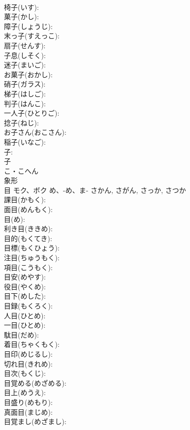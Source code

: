 \documentclass[8pt]{extreport}
\begin{document}
\begin{CJK}{UTF8}{min}
\\	椅子(いす): 
\\	菓子(かし): 
\\	障子(しょうじ): 
\\	末っ子(すえっこ): 
\\	扇子(せんす): 
\\	子息(しそく): 
\\	迷子(まいご): 
\\	お菓子(おかし): 
\\	硝子(ガラス): 
\\	梯子(はしご): 
\\	判子(はんこ): 
\\	一人子(ひとりご): 
\\	捻子(ねじ): 
\\	お子さん(おこさん): 
\\	稲子(いなご): 
\\	子: 
\\	子	
\\	こ・こへん	
\\	象形 
\\	目	モク、ボク	め、-め、ま-	さかん, さがん, さっか, さつか	
\\	課目(かもく): 
\\	面目(めんもく): 
\\	目(め): 
\\	利き目(ききめ): 
\\	目的(もくてき): 
\\	目標(もくひょう): 
\\	注目(ちゅうもく): 
\\	項目(こうもく): 
\\	目安(めやす): 
\\	役目(やくめ): 
\\	目下(めした): 
\\	目録(もくろく): 
\\	人目(ひとめ): 
\\	一目(ひとめ): 
\\	駄目(だめ): 
\\	着目(ちゃくもく): 
\\	目印(めじるし): 
\\	切れ目(きれめ): 
\\	目次(もくじ): 
\\	目覚める(めざめる): 
\\	目上(めうえ): 
\\	目盛り(めもり): 
\\	真面目(まじめ): 
\\	目覚まし(めざまし): 

\end{CJK}
\end{document}
